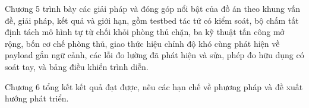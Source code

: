 \documentclass[../DoAn.tex]{subfiles}
\begin{document}
Chương 5 trình bày các giải pháp và đóng góp nổi bật của đồ án theo khung vấn đề, giải pháp, kết quả và giới hạn, gồm testbed tác tử có kiểm soát, bộ chấm tất định tách mô hình tự từ chối khỏi phòng thủ chặn, ba kỹ thuật tấn công mở rộng, bốn cơ chế phòng thủ, giao thức hiệu chỉnh độ khó cùng phát hiện về payload gắn ngữ cảnh, các lỗi đo lường đã phát hiện và sửa, phép đo hữu dụng có soát tay, và bảng điều khiển trình diễn.
 
Chương 6 tổng kết kết quả đạt được, nêu các hạn chế về phương pháp và đề xuất hướng phát triển.
\end{document}
